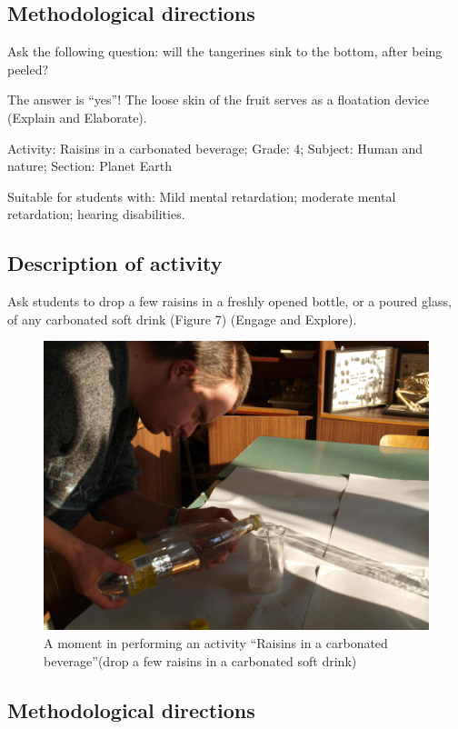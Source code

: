 \documentclass[11.5pt]{sig-alternate} %
\begin{document}
\begin{large}
\subsection*{Methodological directions}

Ask the following question: will the tangerines sink to the bottom, after being peeled?

The answer is “yes”! The loose skin of the fruit serves as a floatation device (Explain and Elaborate).

Activity: Raisins in a carbonated beverage; Grade: 4; Subject: Human and nature; Section: Planet Earth

Suitable for students with: Mild mental retardation; moderate mental retardation; hearing disabilities.

\subsection*{Description of activity}

Ask students to drop a few raisins in a freshly opened bottle, or a poured glass, of any carbonated soft drink (Figure 7) (Engage and Explore).
 
\begin{figure}[h]
    \centering
    \includegraphics[width=0.95\linewidth]{images/fig7.jpg}
    \caption{A moment in performing an activity “Raisins in a carbonated beverage”(drop a few raisins in a carbonated soft drink)}
\end{figure}
\newpage
\subsection*{Methodological directions}


\end{large}
\end{document}
